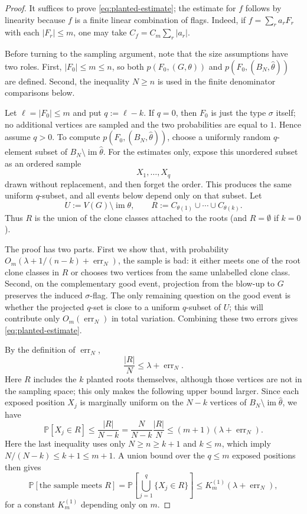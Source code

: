 \documentclass[11pt]{article}
\theoremstyle{definition}
\newcommand{\Prob}{\mathbb{P}}
\begin{document}
\begin{proof}
It suffices to prove \eqref{eq:planted-estimate}; the estimate for $f$ follows
by linearity because $f$ is a finite linear combination of flags.  Indeed, if
$f=\sum_r a_r F_r$ with each $|F_r|\le m$, one may take
$C_f=C_m\sum_r |a_r|$.

Before turning to the sampling argument, note that the size assumptions have two
roles.  First, $|F_0|\le m\le n$, so both
$p(F_0,(G,\theta))$ and $p(F_0,(B_N,\widehat\theta))$ are defined.  Second, the
inequality $N\ge n$ is used in
the finite denominator comparisons below.

Let $\ell=|F_0|\le m$ and put $q:=\ell-k$.  If $q=0$, then $F_0$ is just the
type $\sigma$ itself; no additional vertices are sampled and the two
probabilities are equal to $1$.  Hence assume $q>0$.  To compute
$p(F_0,(B_N,\widehat\theta))$, choose a uniformly random $q$-element subset of
$B_N\setminus\operatorname{im}\widehat\theta$.  For the estimates only, expose
this unordered subset as an ordered sample
\[
  X_1,\ldots,X_q
\]
drawn without replacement, and then forget the order.  This produces the same
uniform $q$-subset, and all events below depend only on that subset.  Let
\[
  U:=V(G)\setminus\operatorname{im}\theta,
  \qquad
  R:=C_{\theta(1)}\cup\cdots\cup C_{\theta(k)} .
\]
Thus $R$ is the union of the clone classes attached to the roots
(and $R=\emptyset$ if $k=0$).

The proof has two parts.  First we show that, with probability
$O_m(\lambda+1/(n-k)+\operatorname{err}_N)$, the sample is bad: it either meets
one of the root clone classes in $R$ or chooses two vertices from the same
unlabelled clone class.  Second, on the complementary good event, projection
from the blow-up to $G$ preserves the induced $\sigma$-flag.  The only remaining
question on the good event is whether the projected $q$-set is close to a
uniform $q$-subset of $U$; this will contribute only
$O_m(\operatorname{err}_N)$ in total variation.  Combining these two errors gives
\eqref{eq:planted-estimate}.

By the definition of $\operatorname{err}_N$,
\[
  \frac{|R|}{N}\le \lambda+\operatorname{err}_N .
\]
Here $R$ includes the $k$ planted roots themselves, although those
vertices are not in the sampling space; this only makes the following upper
bound larger.
Since each exposed position $X_j$ is marginally uniform on the
$N-k$ vertices of $B_N\setminus\operatorname{im}\widehat\theta$, we have
\[
  \Prob[X_j\in R]
  \le
  \frac{|R|}{N-k}
  =
  \frac{N}{N-k}\frac{|R|}{N}
  \le
  (m+1)(\lambda+\operatorname{err}_N).
\]
Here the last inequality uses only $N\ge n\ge k+1$ and $k\le m$, which imply
$N/(N-k)\le k+1\le m+1$.  A union bound over the $q\le m$ exposed positions then gives
\[
  \Prob[\text{the sample meets }R]
  =
  \Prob\!\left[\bigcup_{j=1}^q\{X_j\in R\}\right]
  \le
  K_m^{(1)}(\lambda+\operatorname{err}_N),
\]
for a constant $K_m^{(1)}$ depending only on $m$.


\end{proof}
\end{document}
